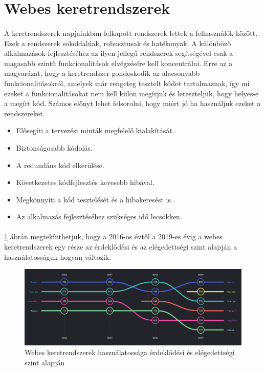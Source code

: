 \section{Webes keretrendszerek}
	\paragraph{}
	A keretrendszerek napjainkban felkapott rendszerek lettek a felhasználók között. Ezek a rendszerek sokoldalúak, robusztusak és hatékonyak. A különböző alkalmazások fejlesztéséhez az ilyen jellegű rendszerek segítségével csak a magasabb szintű funkcionalitások elvégzésére kell koncentrálni. Erre az a magyarázat, hogy a keretrendszer gondoskodik az alacsonyabb funkcionalitásokról, amelyek már rengeteg tesztelt kódot tartalmaznak, így mi ezeket a funkcionalitásokat nem kell külön megírjuk és leteszteljük, hogy helyes-e a megírt kód. Számos előnyt lehet felsorolni, hogy miért jó ha használjuk ezeket a rendszereket.\cite{frameworks}
	\begin{itemize}
		\item Elősegíti a tervezési minták megfelelő kialakítását.
		\item Biztonságosabb kódolás.
		\item A redundáns kód elkerülése.
		\item Következetes kódfejlesztés kevesebb hibával.
		\item Megkönnyíti a kód tesztelését és a hibakeresést is.
		\item Az alkalmazás fejlesztéséhez szükséges idő lecsökken.
	\end{itemize}
	\paragraph{}
	 \ref{fig:vueang} ábrán megtekínthetjük, hogy a 2016-os évtől a 2019-es évig a webes keretrendszerek egy része az érdeklődési és az elégedettségi szint alapján a használatosságuk hogyan változik.
	
	\begin{figure}
		\centering
		\includegraphics[scale=0.6]{figures/images/vueang.png}
		\caption{Webes keretrendszerek használatossága érdeklődési és elégedettségi szint alapján \cite{vueanginterest}}
		\label{fig:vueang}
	\end{figure}

